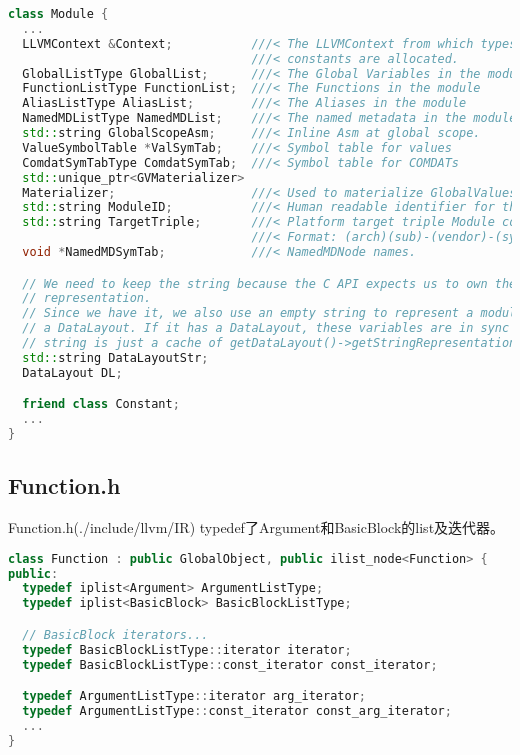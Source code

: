 \documentclass{ctexart}
\begin{document}
\begin{lstlisting}[language=C++]
class Module {
  ...
  LLVMContext &Context;           ///< The LLVMContext from which types and
                                  ///< constants are allocated.
  GlobalListType GlobalList;      ///< The Global Variables in the module
  FunctionListType FunctionList;  ///< The Functions in the module
  AliasListType AliasList;        ///< The Aliases in the module
  NamedMDListType NamedMDList;    ///< The named metadata in the module
  std::string GlobalScopeAsm;     ///< Inline Asm at global scope.
  ValueSymbolTable *ValSymTab;    ///< Symbol table for values
  ComdatSymTabType ComdatSymTab;  ///< Symbol table for COMDATs
  std::unique_ptr<GVMaterializer>
  Materializer;                   ///< Used to materialize GlobalValues
  std::string ModuleID;           ///< Human readable identifier for the module标识符
  std::string TargetTriple;       ///< Platform target triple Module compiled on
                                  ///< Format: (arch)(sub)-(vendor)-(sys0-(abi)
  void *NamedMDSymTab;            ///< NamedMDNode names.

  // We need to keep the string because the C API expects us to own the string
  // representation.
  // Since we have it, we also use an empty string to represent a module without
  // a DataLayout. If it has a DataLayout, these variables are in sync and the
  // string is just a cache of getDataLayout()->getStringRepresentation().
  std::string DataLayoutStr;
  DataLayout DL;

  friend class Constant;  
  ...
}
\end{lstlisting}

\subsection{Function.h}

Function.h(./include/llvm/IR)
typedef了Argument和BasicBlock的list及迭代器。
\begin{lstlisting}[language=C++]
class Function : public GlobalObject, public ilist_node<Function> {
public:
  typedef iplist<Argument> ArgumentListType;
  typedef iplist<BasicBlock> BasicBlockListType;

  // BasicBlock iterators...
  typedef BasicBlockListType::iterator iterator;
  typedef BasicBlockListType::const_iterator const_iterator;

  typedef ArgumentListType::iterator arg_iterator;
  typedef ArgumentListType::const_iterator const_arg_iterator;
  ...
}
\end{lstlisting}
\end{document}
